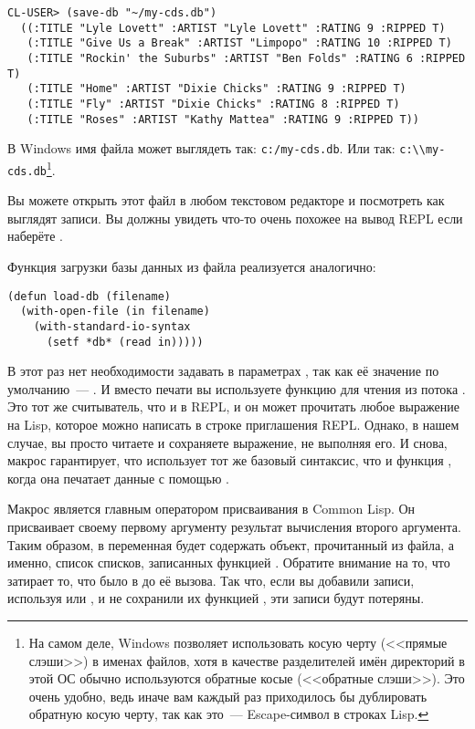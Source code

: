 \begin{lstlisting}[style=lisprepl]
  CL-USER> (save-db "~/my-cds.db")
  ((:TITLE "Lyle Lovett" :ARTIST "Lyle Lovett" :RATING 9 :RIPPED T)
   (:TITLE "Give Us a Break" :ARTIST "Limpopo" :RATING 10 :RIPPED T)
   (:TITLE "Rockin' the Suburbs" :ARTIST "Ben Folds" :RATING 6 :RIPPED T)
   (:TITLE "Home" :ARTIST "Dixie Chicks" :RATING 9 :RIPPED T)
   (:TITLE "Fly" :ARTIST "Dixie Chicks" :RATING 8 :RIPPED T)
   (:TITLE "Roses" :ARTIST "Kathy Mattea" :RATING 9 :RIPPED T))
\end{lstlisting}

В Windows имя файла может выглядеть так: \lstinline!c:/my-cds.db!. Или так:
\lstinline!c:\\my-cds.db!\footnote{На самом деле, Windows позволяет использовать косую
  черту (<<прямые слэши>>) в именах файлов, хотя в качестве разделителей имён директорий в
  этой ОС обычно используются обратные косые (<<обратные слэши>>). Это очень удобно, ведь
  иначе вам каждый раз приходилось бы дублировать обратную косую черту, так как это~---
  Escape-символ в строках Lisp.}.

Вы можете открыть этот файл в любом текстовом редакторе и посмотреть как выглядят
записи. Вы должны увидеть что-то очень похожее на вывод REPL если наберёте .

Функция загрузки базы данных из файла реализуется аналогично:

\begin{lstlisting}
(defun load-db (filename)
  (with-open-file (in filename)
    (with-standard-io-syntax
      (setf *db* (read in)))))
\end{lstlisting}

В этот раз нет необходимости задавать  в параметрах
, так как её значение по умолчанию~--- . И вместо печати
вы используете функцию  для чтения из потока . Это тот же
считыватель, что и в REPL, и он может прочитать любое выражение на Lisp, которое можно
написать в строке приглашения REPL. Однако, в нашем случае, вы просто читаете и сохраняете
выражение, не выполняя его. И снова, макрос  гарантирует,
что  использует тот же базовый синтаксис, что и функция , когда
она печатает данные с помощью .

Макрос  является главным оператором присваивания в Common Lisp. Он
присваивает своему первому аргументу результат вычисления второго аргумента. Таким образом,
в  переменная  будет содержать объект, прочитанный из файла, а
именно, список списков, записанных функцией . Обратите внимание на то, что
 затирает то, что было в  до её вызова. Так что, если вы добавили
записи, используя  или , и не сохранили их функцией
, эти записи будут потеряны.

